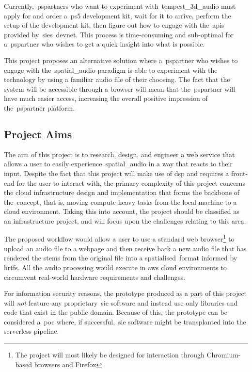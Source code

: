 Currently,~\glspl{pspartner} who want to experiment with~\gls{tempest_3d_audio} must apply for and order a~\gls{ps5} development kit, wait for it to arrive, perform the setup of the development kit, then figure out how to engage with the~\glspl{api} provided by~\glspl{sie}~\gls{devnet}.
This process is time-consuming and sub-optimal for a~\gls{pspartner} who wishes to get a quick insight into what is possible.

This project proposes an alternative solution where a~\gls{pspartner} who wishes to engage with the~\gls{spatial_audio} paradigm is able to experiment with the technology by using a familiar audio file of their choosing.
The fact that the system will be accessible through a browser will mean that the~\gls{pspartner} will have much easier access, increasing the overall positive impression of the~\gls{pspartner} platform.

\subsection{Project Aims}\label{subsec:aims}

The aim of this project is to research, design, and engineer a web service that allows a user to easily experience~\gls{spatial_audio} in a way that reacts to their input.
Despite the fact that this project will make use of \gls{dsp} and requires a front-end for the user to interact with, the primary complexity of this project concerns the cloud infrastructure design and implementation that forms the backbone of the\textit{}~concept, that is, moving compute-heavy tasks from the local machine to a cloud environment.
Taking this into account, the project should be classified as an infrastructure project, and will focus upon the challenges relating to this area.

The proposed workflow would allow a user to use a standard web browser\footnote{The project will most likely be designed for interaction through Chromium-based browsers and Firefox} to upload an audio file to a webpage and then receive back a new audio file that has rendered the stems from the original file into a \textquotesingle spatialised\textquotesingle ~format informed by \glspl{hrtf}.
All the audio processing would execute in \gls{aws} cloud environments to circumvent real-world hardware requirements and challenges.

For information security reasons, the prototype produced as a part of this project will \textit{not} feature any proprietary~\gls{sie} software and instead use only libraries and code that exist in the public domain.
Because of this, the prototype can be considered a~\gls{poc} where, if successful,~\gls{sie} software might be transplanted into the serverless pipeline.

